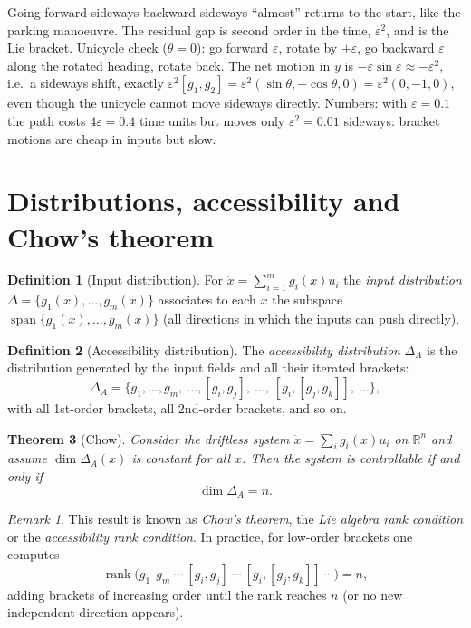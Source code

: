 \documentclass[11pt,a4paper]{article}
\newcommand{\R}{\mathbb{R}}
\newcommand{\LB}[2]{[#1,#2]}
\newcommand{\Dist}{\Delta}
\newcommand{\AccDist}{\Delta_A}
\DeclareMathOperator{\rank}{rank}
\DeclareMathOperator{\spn}{span}
\theoremstyle{plain}
\newtheorem{theorem}{Theorem}[section]
\theoremstyle{definition}
\newtheorem{definition}[theorem]{Definition}
\theoremstyle{remark}
\newtheorem*{remark}{Remark}
\begin{document}
\begin{intuition}
Going forward-sideways-backward-sideways ``almost'' returns to the start, like the parking manoeuvre. The residual gap is second order in the time, $\varepsilon^2$, and is the Lie bracket. Unicycle check ($\theta=0$): go forward $\varepsilon$, rotate by $+\varepsilon$, go backward $\varepsilon$ along the rotated heading, rotate back. The net motion in $y$ is $-\varepsilon\sin\varepsilon\approx-\varepsilon^2$, i.e.\ a sideways shift, exactly $\varepsilon^2\LB{g_1}{g_2}=\varepsilon^2(\sin\theta,-\cos\theta,0)=\varepsilon^2(0,-1,0)$, even though the unicycle cannot move sideways directly. Numbers: with $\varepsilon=0.1$ the path costs $4\varepsilon=0.4$ time units but moves only $\varepsilon^2=0.01$ sideways: bracket motions are cheap in inputs but slow.
\end{intuition}

\section{Distributions, accessibility and Chow's theorem}

\begin{definition}[Input distribution]
For $\dot x=\sum_{i=1}^m g_i(x)u_i$ the \emph{input distribution} $\Dist=\{g_1(x),\dots,g_m(x)\}$ associates to each $x$ the subspace $\spn\{g_1(x),\dots,g_m(x)\}$ (all directions in which the inputs can push directly).
\end{definition}

\begin{definition}[Accessibility distribution]
The \emph{accessibility distribution} $\AccDist$ is the distribution generated by the input fields and all their iterated brackets:
\[
\AccDist=\Big\{g_1,\dots,g_m,\ \dots,\LB{g_i}{g_j},\ \dots,\ \LB{g_i}{\LB{g_j}{g_k}},\ \dots\Big\},
\]
with all 1st-order brackets, all 2nd-order brackets, and so on.
\end{definition}

\begin{theorem}[Chow]
\label{thm:chow}
Consider the driftless system $\dot x=\sum_i g_i(x)u_i$ on $\R^n$ and assume $\dim\AccDist(x)$ is constant for all $x$. Then the system is controllable if and only if
\[
\dim\AccDist=n .
\]
\end{theorem}

\begin{remark}
This result is known as \emph{Chow's theorem}, the \emph{Lie algebra rank condition} or the \emph{accessibility rank condition}. In practice, for low-order brackets one computes
\[
\rank\Big(g_1\ \ g_m\ \cdots\ \LB{g_i}{g_j}\ \cdots\ \LB{g_i}{\LB{g_j}{g_k}}\ \cdots\Big)=n,
\]
adding brackets of increasing order until the rank reaches $n$ (or no new independent direction appears).
\end{remark}
\end{document}
